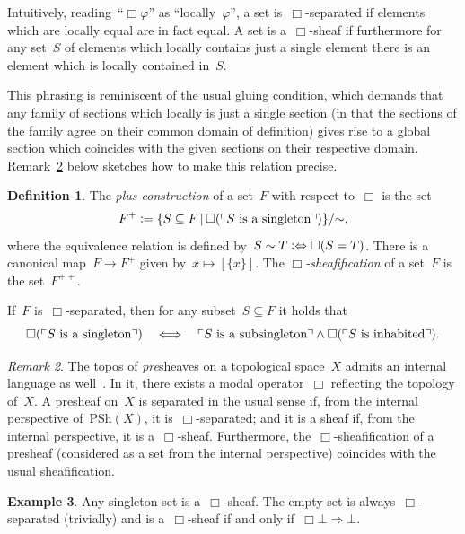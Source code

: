 \documentclass[10pt,reqno,a4paper]{amsbook}
\theoremstyle{definition}
\newtheorem{defn}{Definition}[section]
\newtheorem{ex}[defn]{Example}
\theoremstyle{plain}
\theoremstyle{remark}
\newtheorem{rem}[defn]{Remark}
\newcommand{\PSh}{\mathrm{PSh}}
\newcommand{\?}{\,{:}\,}
\renewcommand{\_}{\mathpunct{.}\,}
\newcommand{\speak}[1]{\ulcorner\text{\textnormal{#1}}\urcorner}
\newcommand{\defeq}{\vcentcolon=}
\begin{document}
Intuitively, reading~``$\Box\varphi$'' as ``locally~$\varphi$'', a set
is~$\Box$-separated if elements which are locally equal are in fact equal. A
set is a~$\Box$-sheaf if furthermore for any set~$S$ of elements which locally
contains just a single element there is an element which is locally contained
in~$S$.

This phrasing is reminiscent of the usual gluing condition, which demands that
any family of sections which locally is just a single section (in that the
sections of the family agree on their common domain of definition) gives rise
to a global section which coincides with the given sections on their respective
domain. Remark~\ref{rem:modal-operator-in-presheaf-topos} below sketches how to
make this relation precise.

\begin{defn}\label{defn:plus-construction}
The \emph{plus construction} of a set~$F$ with respect to~$\Box$ is the set
\[ F^+ \defeq \{ S \subseteq F \,|\, \Box(\speak{$S$ is a singleton}) \}/{\sim},
\]
where the equivalence relation is defined by~$S \sim T \vcentcolon\Leftrightarrow
\Box(S = T)$. There is a canonical map~$F \to F^+$ given by~$x \mapsto
[\{x\}]$. The \emph{$\Box$-sheafi\-fi\-ca\-tion} of a set~$F$ is the
set~$F^{++}$.
\end{defn}

If~$F$ is~$\Box$-separated, then for any subset~$S \subseteq F$ it holds
that
\[ \Box(\speak{$S$ is a singleton}) \quad\Longleftrightarrow\quad
  \speak{$S$ is a subsingleton} \wedge \Box(\speak{$S$ is inhabited}). \]

\begin{rem}\label{rem:modal-operator-in-presheaf-topos}
The topos of \emph{pre}sheaves on a topological space~$X$ admits an
internal language as well~\cite[Section~VI.7, discussion after
Theorem~1]{moerdijk-maclane:sheaves-logic}. In it, there
exists a modal operator~$\Box$ reflecting the topology of~$X$. A presheaf on~$X$ is separated
in the usual sense if, from the internal perspective of~$\PSh(X)$, it
is~$\Box$-separated; and it is a sheaf if, from the internal perspective, it
is a~$\Box$-sheaf. Furthermore, the~$\Box$-sheafification of a presheaf
(considered as a set from the internal perspective) coincides with the usual
sheafification.\end{rem}

\begin{ex}\label{ex:special-sets-sheaves}
Any singleton set is a~$\Box$-sheaf. The empty set is
always~$\Box$-separated (trivially) and is a~$\Box$-sheaf if and only
if~$\Box\bot \Rightarrow \bot$.\end{ex}
\end{document}
